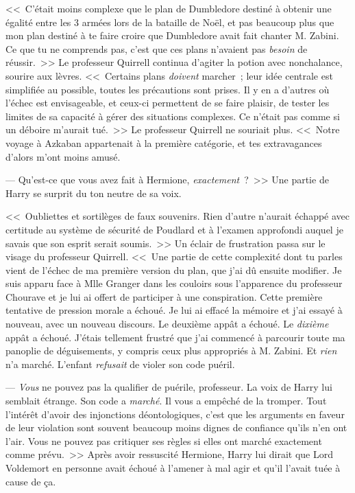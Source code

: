 <<~C'était moins complexe que le plan de Dumbledore destiné à obtenir une égalité entre les 3 armées lors de la bataille de Noël, et pas beaucoup plus que mon plan destiné à te faire croire que Dumbledore avait fait chanter M. Zabini. Ce que tu ne comprends pas, c'est que ces plans n'avaient pas \emph{besoin} de réussir.~>> Le professeur Quirrell continua d'agiter la potion avec nonchalance, sourire aux lèvres. <<~Certains plans \emph{doivent} marcher~; leur idée centrale est simplifiée au possible, toutes les précautions sont prises. Il y en a d'autres où l'échec est envisageable, et ceux-ci permettent de se faire plaisir, de tester les limites de sa capacité à gérer des situations complexes. Ce n'était pas comme si un déboire m'aurait tué.~>> Le professeur Quirrell ne souriait plus. <<~Notre voyage à Azkaban appartenait à la première catégorie, et tes extravagances d'alors m'ont moins amusé.

--- Qu'est-ce que vous avez fait à Hermione, \emph{exactement}~?~>> Une partie de Harry se surprit du ton neutre de sa voix.

<<~Oubliettes et sortilèges de faux souvenirs. Rien d'autre n'aurait échappé avec certitude au système de sécurité de Poudlard et à l'examen approfondi auquel je savais que son esprit serait soumis.~>> Un éclair de frustration passa sur le visage du professeur Quirrell. <<~Une partie de cette complexité dont tu parles vient de l'échec de ma première version du plan, que j'ai dû ensuite modifier. Je suis apparu face à Mlle Granger dans les couloirs sous l'apparence du professeur Chourave et je lui ai offert de participer à une conspiration. Cette première tentative de pression morale a échoué. Je lui ai effacé la mémoire et j'ai essayé à nouveau, avec un nouveau discours. Le deuxième appât a échoué. Le \emph{dixième} appât a échoué. J'étais tellement frustré que j'ai commencé à parcourir toute ma panoplie de déguisements, y compris ceux plus appropriés à M. Zabini. Et \emph{rien} n'a marché. L'enfant \emph{refusait} de violer son code puéril.

--- \emph{Vous} ne pouvez pas la qualifier de puérile, professeur. La voix de Harry lui semblait étrange. Son code a \emph{marché}. Il vous a empêché de la tromper. Tout l'intérêt d'avoir des injonctions déontologiques, c'est que les arguments en faveur de leur violation sont souvent beaucoup moins dignes de confiance qu'ils n'en ont l'air. Vous ne pouvez pas critiquer ses règles si elles ont marché exactement comme prévu.~>> Après avoir ressuscité Hermione, Harry lui dirait que Lord Voldemort en personne avait échoué à l'amener à mal agir et qu'il l'avait tuée à cause de ça.

